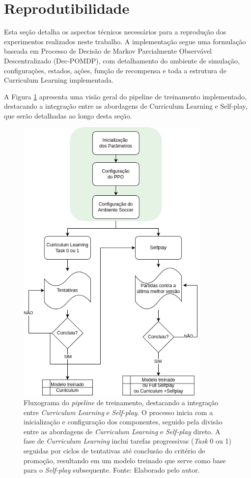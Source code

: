 \section{Reprodutibilidade}
\label{sec:reprodutibilidade}
Esta seção detalha os aspectos técnicos necessários para a reprodução dos experimentos realizados neste trabalho. A implementação segue uma formulação baseada em Processo de Decisão de Markov Parcialmente Observável Descentralizado (Dec-POMDP), com detalhamento do ambiente de simulação, configurações, estados, ações, função de recompensa e toda a estrutura de Curriculum Learning implementada.

A Figura \ref{fig:fluxograma_treino} apresenta uma visão geral do pipeline de treinamento implementado, destacando a integração entre as abordagens de Curriculum Learning e Self-play, que serão detalhadas ao longo desta seção.

\begin{figure}[H]
    \centering
    \includegraphics[width=0.85\textwidth]{fig/fluxograma_treino_mestrado.png}
    \caption{Fluxograma do \textit{pipeline} de treinamento, destacando a integração entre \textit{Curriculum Learning} e \textit{Self-play}. O processo inicia com a inicialização e configuração dos componentes, seguido pela divisão entre as abordagens de \textit{Curriculum Learning} e \textit{Self-play} direto. A fase de \textit{Curriculum Learning} inclui tarefas progressivas (\textit{Task} 0 ou 1) seguidas por ciclos de tentativas até conclusão do critério de promoção, resultando em um modelo treinado que serve como base para o \textit{Self-play} subsequente. Fonte: Elaborado pelo autor.}
    \label{fig:fluxograma_treino}
\end{figure}

